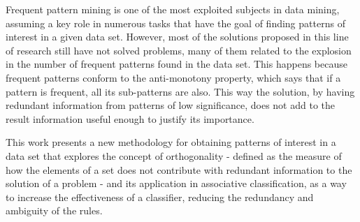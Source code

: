 Frequent pattern mining is one of the most exploited subjects in data mining, assuming a key role in numerous tasks that have the goal of finding patterns of interest in a given data set. However, most of the solutions proposed in this line of research still have not solved problems, many of them related to the explosion in the number of frequent patterns found in the data set. This happens because frequent patterns conform to the anti-monotony property, which says that if a pattern is frequent, all its sub-patterns are also. This way the solution, by having redundant information from patterns of low significance, does not add to the result information useful enough to justify its importance.
\par
This work presents a new methodology for obtaining patterns of interest in a data set that explores the concept of orthogonality - defined as the measure of how the elements of a set does not contribute with redundant information to the solution of a problem - and its application in associative classification, as a way to increase the effectiveness of a classifier, reducing the redundancy and ambiguity of the rules.